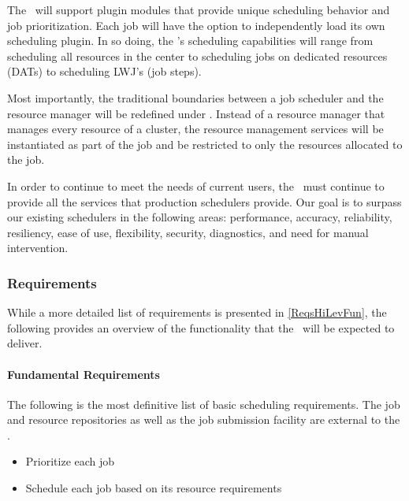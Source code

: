 The \ngjs\ will support plugin modules that provide unique scheduling
behavior and job prioritization.  Each job will have the option to
independently load its own scheduling plugin.  In so doing, the
\ngjs's scheduling capabilities will range from scheduling all
resources in the center to scheduling jobs on dedicated resources
(DATs) to scheduling LWJ's (job steps).

Most importantly, the traditional boundaries between a job scheduler
and the resource manager will be redefined under \ngrm.  Instead of a
resource manager that manages every resource of a cluster, the
resource management services will be instantiated as part of the job
and be restricted to only the resources allocated to the job.

In order to continue to meet the needs of current users, the
\ngjs\ must continue to provide all the services that production
schedulers provide.  Our goal is to surpass our existing schedulers in
the following areas: performance, accuracy, reliability, resiliency,
ease of use, flexibility, security, diagnostics, and need for manual
intervention.

\subsubsection{Requirements}

While a more detailed list of requirements is presented in
\ref{ReqsHiLevFun}, the following provides an overview of the
functionality that the \ngjs\ will be expected to deliver.

\paragraph{Fundamental Requirements}

The following is the most definitive list of basic scheduling
requirements.  The job and resource repositories as well as the job
submission facility are external to the \ngjs.

\ifcomments
{}

\begin{itemize}
  \item Prioritize each job
  \item Schedule each job based on its resource requirements
\end{itemize}

